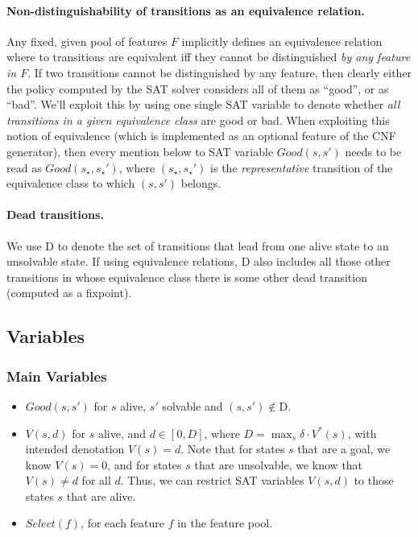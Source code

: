 \documentclass[a4paper]{article}
\newcommand{\badtx}{\ensuremath{\mathrm{D}}}
\begin{document}
\paragraph{Non-distinguishability of transitions as an equivalence relation.}
Any fixed, given pool of features $F$ implicitly defines an equivalence relation where to transitions are
equivalent iff they cannot be distinguished \emph{by any feature in $F$}.
If two transitions cannot be distinguished by any feature, then clearly either the policy computed by the SAT solver
considers all of them as ``good'', or as ``bad''.
We'll exploit this by using one single SAT variable to denote whether \emph{all transitions in a given equivalence
class} are good or bad. When exploiting this notion of equivalence (which is implemented as an optional feature of
the CNF generator), then every mention below to SAT variable $Good(s, s')$ needs to be read as $Good(s_{\star}, s_{\star}')$,
where $(s_{\star}, s_{\star}')$ is the \emph{representative} transition of the equivalence class to which $(s, s')$ belongs.

\paragraph{Dead transitions.}
We use \badtx{} to denote the set of transitions that lead from one alive state to an unsolvable state.
If using equivalence relations, \badtx{} also includes all those other transitions in whose equivalence class
there is some other dead transition (computed as a fixpoint).


\newpage

\subsection{Variables}

\subsubsection{Main Variables}
\begin{itemize}
 \item $Good(s, s')$ for $s$ alive, $s'$ solvable and $(s, s') \not\in \badtx$.

 \item $V(s, d)$ for $s$ alive, and $d \in [0, D]$, where $D = \max_{s} \delta \cdot V^*(s)$,
 with intended denotation $V(s)=d$.
 Note that for states $s$ that are a goal, we know $V(s)=0$,
 and for states $s$ that are unsolvable, we know that $V(s) \neq d$ for all $d$.
 Thus, we can restrict SAT variables $V(s, d)$ to those states $s$ that are alive.

 \item $Select(f)$, for each feature $f$ in the feature pool.
\end{itemize}
\end{document}
